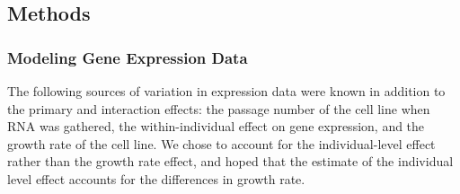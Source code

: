 
\subsection{Methods}\label{sec:org53944c4}


\subsubsection{Modeling Gene Expression Data}\label{sec:orgc908098}

The following sources of variation in expression data were known in addition to the primary and interaction effects: the passage number of the cell line when RNA was gathered,
the within-individual effect on gene expression, and the growth rate of the cell line.  We chose to account for the individual-level effect rather than the growth rate effect, and hoped that the estimate of the individual level effect accounts for the differences in growth rate. 

